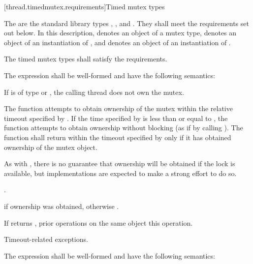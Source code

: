 [thread.timedmutex.requirements]{Timed mutex types}

\pnum
The  are the standard library types ,
, and . They shall
meet the requirements set out below.
In this description,  denotes an object of a mutex type,
 denotes an object of an
instantiation of , and  denotes an
object of an
instantiation of .

\pnum
The timed mutex types shall satisfy the 
requirements.

\pnum
The expression  shall be well-formed and have the
following semantics:

\begin{itemdescr}
\pnum
\requires If  is of type  or
, the calling thread does not
own the mutex.

\pnum
\effects The function attempts to obtain ownership of the mutex within the
relative timeout
specified by . If the time specified by  is less than or
equal to , the function attempts to obtain ownership without blocking (as if by calling
). The function shall return within the timeout specified by
 only if it has obtained ownership of the mutex object. \begin{note} As
with , there is no guarantee that ownership will be obtained if the
lock is available, but implementations are expected to make a strong effort to do so.
\end{note}

\pnum
\returntype {}.

\pnum
\returns {} if ownership was obtained, otherwise .

\pnum
\sync If  returns , prior  operations
on the same object  this operation.

\pnum\throws Timeout-related exceptions.
\end{itemdescr}

\pnum
The expression  shall be well-formed and have the
following semantics:

